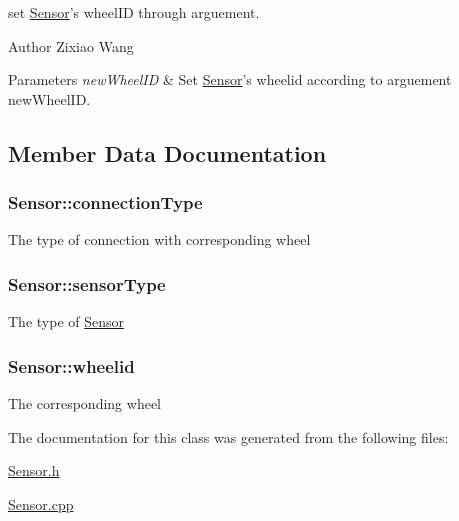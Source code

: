 set \hyperlink{classSensor}{Sensor}'s wheel\-I\-D through arguement. 

\begin{DoxyAuthor}{Author}
Zixiao Wang 
\end{DoxyAuthor}

\begin{DoxyParams}{Parameters}
{\em new\-Wheel\-I\-D} & Set \hyperlink{classSensor}{Sensor}'s wheelid according to arguement new\-Wheel\-I\-D. \\
\hline
\end{DoxyParams}


\subsection{Member Data Documentation}
\hypertarget{classSensor_a815bec85b7f50e297d71e3bced3a017d}{
\subsubsection[{connection\-Type}]{ Sensor\-::connection\-Type\hspace{0.3cm}{\ttfamily [private]}}}\label{classSensor_a815bec85b7f50e297d71e3bced3a017d}
The type of connection with corresponding wheel \hypertarget{classSensor_a69b674df6303a1007069aab4730807cd}{
\subsubsection[{sensor\-Type}]{ Sensor\-::sensor\-Type\hspace{0.3cm}{\ttfamily [private]}}}\label{classSensor_a69b674df6303a1007069aab4730807cd}
The type of \hyperlink{classSensor}{Sensor} \hypertarget{classSensor_a6a88e3c8df6e481794380a3a0579bc34}{
\subsubsection[{wheelid}]{ Sensor\-::wheelid\hspace{0.3cm}{\ttfamily [private]}}}\label{classSensor_a6a88e3c8df6e481794380a3a0579bc34}
The corresponding wheel 

The documentation for this class was generated from the following files\-:\begin{DoxyCompactItemize}
\item 
\hyperlink{Sensor_8h}{Sensor.\-h}\item 
\hyperlink{Sensor_8cpp}{Sensor.\-cpp}\end{DoxyCompactItemize}
